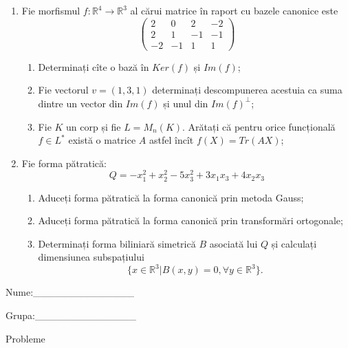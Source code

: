 \documentclass{article}
\begin{document}
\begin{enumerate}
 \item Fie morfismul $f:\mathbb{R}^4 \to \mathbb{R}^3$ al cărui matrice în raport cu bazele canonice este
$$\begin{pmatrix}
2&0&2&-2\\
2&1&-1&-1\\
-2&-1&1&1
\end{pmatrix}$$

\begin{enumerate}
\item Determinați cîte o bază în $Ker(f)$ și $Im(f)$;
\item Fie vectorul $v=(1,3,1)$ determinați descompunerea acestuia ca suma dintre un vector din $Im(f)$ și unul din $Im(f)^\perp$;
\item Fie $K$ un corp și fie $L=M_n(K)$. Arătați că pentru orice funcțională $f \in L^*$ există o matrice $A$ astfel încît $f(X)=Tr(AX)$;
\end{enumerate}
\item Fie forma pătratică:
$$Q= -x_1^2+x_2^2-5x_3^2+3x_1x_3+4x_2x_3$$

\begin{enumerate}
\item Aduceți forma pătratică la forma canonică prin metoda Gauss;
\item Aduceți forma pătratică la forma canonică prin transformări ortogonale;
\item Determinați forma biliniară simetrică $B$ asociată lui $Q$ și calculați dimensiunea subspațiului
$$\{x \in \mathbb{R}^3 | B(x,y)=0,\forall y \in \mathbb{R}^3\}.$$

\end{enumerate}
\end{enumerate}
\newpage
\begin{flushright}
Nume:\_\_\_\_\_\_\_\_\_\_\_\_\_\_
 
 
Grupa:\_\_\_\_\_\_\_\_\_\_\_\_\_\_
\end{flushright}
\begin{center}
\vspace{2cm}
{\Large Probleme}
\vspace{2cm}
\end{center}
\end{document}
